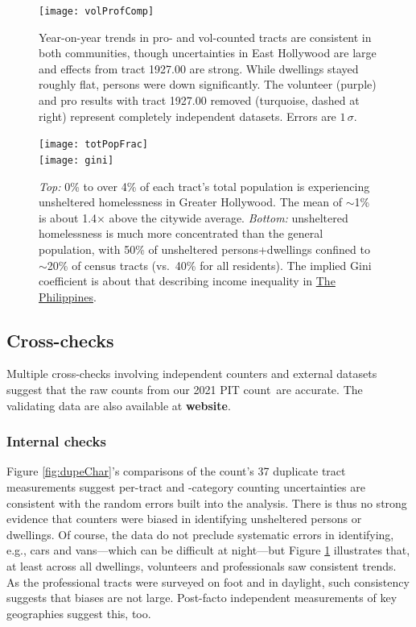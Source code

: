 \documentclass[11pt,twocolumn]{article}
\def\bfr{\bf\color{red}}
\def\Count{count}
\begin{document}
\begin{figure}[t]
	\centering
	\texttt{[image: volProfComp]}
	\caption{Year-on-year trends in pro- and vol-counted tracts are consistent in both 
			communities, though uncertainties in East Hollywood are large and
			effects from tract 1927.00 are strong. While dwellings stayed roughly flat, 
			persons were down significantly. The volunteer (purple) and pro results 
			with tract 1927.00 removed (turquoise, dashed at right) represent
			completely independent datasets. Errors are $1\,\sigma$.}
	\label{fig:proVolComp}
\end{figure}

\begin{figure}[t!]
	\centering
	\texttt{[image: totPopFrac]}\\
	\texttt{[image: gini]}
	\caption{{\it Top:} 0\% to over 4\% of each tract's total population is experiencing unsheltered
			homelessness in Greater Hollywood. The mean of $\sim$1\% is about 1.4$\times$ above
			the citywide average. {\it Bottom:} unsheltered homelessness is much more concentrated 
			than the general population, with 50\% of unsheltered persons+dwellings confined to 
			$\sim$20\% of census tracts (vs.\ 40\%	for all residents). The implied Gini coefficient
			is about that describing income inequality in 
			\href{https://en.wikipedia.org/wiki/List_of_countries_by_income_equality}
			{The Philippines}.}
	\label{fig:gini}
\end{figure}

\subsection{Cross-checks}
\label{sec:crossChecks}

Multiple cross-checks involving independent counters and external datasets suggest 
that the raw counts from our 2021 PIT \Count\ are accurate. The validating data are also
available at {\bfr website}.

\subsubsection{Internal checks}

Figure \ref{fig:dupeChar}'s comparisons of the count's 37 duplicate tract measurements suggest 
per-tract and -category counting uncertainties are consistent with the random errors built into the analysis. 
There is thus no strong evidence that counters were biased in identifying unsheltered persons or dwellings. 
Of course, the data do not preclude systematic errors in identifying, e.g., cars and 
vans---which can be difficult at night---but Figure \ref{fig:proVolComp} illustrates that, at least across all
dwellings, volunteers and professionals saw consistent trends. As the professional tracts were surveyed 
on foot and in daylight, such consistency suggests that biases are not large. Post-facto independent 
measurements of key geographies suggest this, too.
\end{document}
